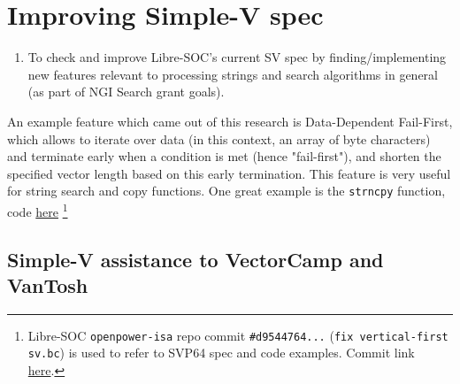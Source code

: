 %

\chapter{Improving Simple-V spec}

\begin{enumerate}
  \item To check and improve Libre-SOC's current \acrfull{SV} spec by finding/implementing
  new features relevant to processing strings and search algorithms in general
  (as part of \acrshort{NGI} Search grant goals).
\end{enumerate}

An example feature which came out of this research is
Data-Dependent Fail-First, which allows to iterate over data (in
this context, an array of byte characters) and terminate early when
a condition is met (hence "fail-first"), and shorten the specified
vector length based on this early termination. This feature is very useful
for string search and copy functions.
One great example is the \texttt{strncpy} function,
code \href{https://git.libre-soc.org/?p=openpower-isa.git;a=blob;f=src/openpower/decoder/isa/test_caller_svp64_ldst.py;h=4ecf534777a5e8a0178b29dbcd69a1a5e2dd14d6;hb=d9544764b1710f3807a9c0685d150a665f70b9a2#l31}{here}
\footnote{Libre-SOC \texttt{openpower-isa} repo commit \texttt{\#d9544764...}
(\texttt{fix vertical-first sv.bc}) is used to refer to
\acrshort{SVP64} spec and code examples. Commit link
\href{https://git.libre-soc.org/?p=openpower-isa.git;a=commit;h=d9544764b1710f3807a9c0685d150a665f70b9a2}{here}.}

\section{Simple-V assistance to VectorCamp and VanTosh}

